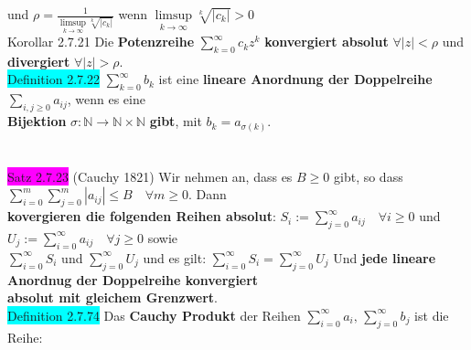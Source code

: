 \documentclass[10pt]{article}
\begin{document}
                und 
                \textcolor{NavyBlue}{$\rho=\frac{1}{\limsup\limits_{k\to\infty}\sqrt[k]{|c_k|}}$}
                wenn 
                \textcolor{NavyBlue}{$\limsup\limits_{k\to\infty}\sqrt[k]{|c_k|} >0$}\\
\colorbox{BurntOrange}{Korollar 2.7.21} Die \textbf{Potenzreihe}
                \textcolor{NavyBlue}{$\sum_{k=0}^\infty c_kz^k$}
                \textbf{konvergiert absolut} 
                \textcolor{NavyBlue}{$\forall |z|<\rho$} und \textbf{divergiert} 
                \textcolor{NavyBlue}{$\forall |z|>\rho$}.\\
\colorbox{cyan}{Definition 2.7.22} \textcolor{NavyBlue}{$\sum_{k=0}^\infty b_k$}
                ist eine \textbf{lineare Anordnung der Doppelreihe} 
                \textcolor{NavyBlue}{$\sum_{i,j\geqslant0}a_{ij}$}, wenn es eine \\
        \indent \textbf{Bijektion} 
                \textcolor{NavyBlue}{$\sigma:\mathbb{N}\longrightarrow\mathbb{N}\times\mathbb{N}$}
                \textbf{gibt}, mit \textcolor{NavyBlue}{$b_k=a_{\sigma(k)}$}.\\
\,\\
\,\\
\colorbox{magenta}{Satz 2.7.23} (Cauchy 1821) Wir nehmen an, dass es 
                \textcolor{NavyBlue}{$B\geqslant0$} gibt, so dass 
                \textcolor{NavyBlue}{
                $\sum_{i=0}^m\sum_{j=0}^m|a_{ij}|\leqslant B\quad\forall m\geqslant0$}.
                Dann \\
        \indent \textbf{kovergieren die folgenden Reihen absolut}: 
                \textcolor{NavyBlue}{$S_i:=\sum_{j=0}^\infty a_{ij}\quad\forall i\geqslant0$} 
                und 
                \textcolor{NavyBlue}{$U_j:=\sum_{i=0}^\infty a_{ij}\quad\forall j\geqslant0$}
                sowie \\
        \indent \textcolor{NavyBlue}{$\sum_{i=0}^\infty S_i$} 
                und \textcolor{NavyBlue}{$\sum_{j=0}^\infty U_j$}
                und es gilt: 
                \textcolor{NavyBlue}{$\sum_{i=0}^\infty S_i=\sum_{j=0}^\infty U_j$}
                Und \textbf{jede lineare Anordnug der Doppelreihe konvergiert \\
        \indent absolut mit gleichem Grenzwert}.\\
\colorbox{cyan}{Definition 2.7.74} Das \textbf{Cauchy Produkt} der Reihen 
                \textcolor{NavyBlue}{$\sum_{i=0}^\infty a_i,\,\sum_{j=0}^\infty b_j$} 
                ist die Reihe: \\
\end{document}
